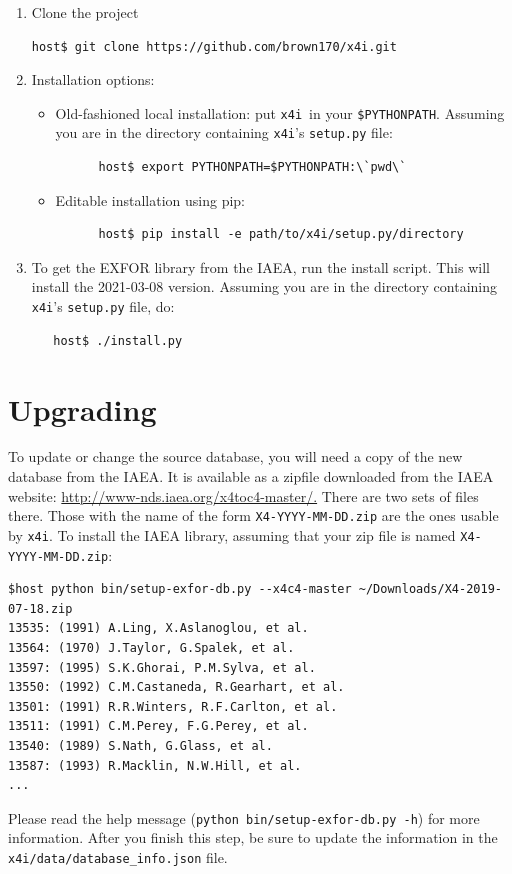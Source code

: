 \documentclass[11pt]{article}
\newcommand{\xfouri}{\texttt{x4i}}
\begin{document}
\begin{enumerate}
\item Clone the project
\begin{verbatim}
host$ git clone https://github.com/brown170/x4i.git
\end{verbatim}

\item Installation options:
  \begin{itemize}
    \item Old-fashioned local installation: put \xfouri\ in your \texttt{\$PYTHONPATH}.  Assuming you are in the directory containing \xfouri's \texttt{setup.py} file:
      \begin{verbatim}
      host$ export PYTHONPATH=$PYTHONPATH:\`pwd\`
      \end{verbatim}

    \item Editable installation using pip:
      \begin{verbatim}
      host$ pip install -e path/to/x4i/setup.py/directory
      \end{verbatim}
  \end{itemize}

\item To get the EXFOR library from the IAEA, run the install script.  This will install the 2021-03-08 version.  Assuming you are in the directory containing \xfouri's \texttt{setup.py} file, do:
  \begin{verbatim}
   host$ ./install.py
  \end{verbatim}
\end{enumerate}


\section{Upgrading}
To update or change the source database, you will need a copy of the new database from the IAEA.  It is available as a zipfile downloaded from the IAEA website: \url{http://www-nds.iaea.org/x4toc4-master/.}  There are two sets of files there.  Those with the name of the form \texttt{X4-YYYY-MM-DD.zip} are the ones usable by \xfouri.  To install the IAEA library, assuming that your zip file is named  \texttt{X4-YYYY-MM-DD.zip}:
\begin{verbatim}
$host python bin/setup-exfor-db.py --x4c4-master ~/Downloads/X4-2019-07-18.zip
13535: (1991) A.Ling, X.Aslanoglou, et al.
13564: (1970) J.Taylor, G.Spalek, et al.
13597: (1995) S.K.Ghorai, P.M.Sylva, et al.
13550: (1992) C.M.Castaneda, R.Gearhart, et al.
13501: (1991) R.R.Winters, R.F.Carlton, et al.
13511: (1991) C.M.Perey, F.G.Perey, et al.
13540: (1989) S.Nath, G.Glass, et al.
13587: (1993) R.Macklin, N.W.Hill, et al.
...
\end{verbatim}
Please read the help message (\texttt{python bin/setup-exfor-db.py -h}) for more information.  After you finish this step,
be sure to update the information in the \texttt{x4i/data/database\_info.json} file.
\end{document}
